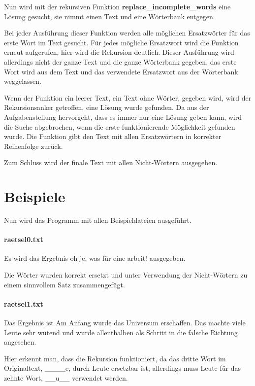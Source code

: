 \documentclass[a4paper,10pt,ngerman]{scrartcl}
\begin{document}
Nun wird mit der rekursiven Funktion \textbf{replace\_incomplete\_words} eine Lösung gesucht, sie nimmt einen Text und eine Wörterbank entgegen.

Bei jeder Ausführung dieser Funktion werden alle möglichen Ersatzwörter für das erste Wort im Text gesucht.
Für jedes mögliche Ersatzwort wird die Funktion erneut aufgerufen, hier wird die Rekursion deutlich.
Dieser Ausführung wird allerdings nicht der ganze Text und die ganze Wörterbank gegeben, das erste Wort wird aus dem Text und das verwendete Ersatzwort aus der Wörterbank weggelassen.

Wenn der Funktion ein leerer Text, ein Text ohne Wörter, gegeben wird, wird der Rekursionsanker getroffen, eine Lösung wurde gefunden.
Da aus der Aufgabenstellung hervorgeht, dass es immer nur eine Lösung geben kann, wird die Suche abgebrochen, wenn die erste funktionierende Möglichkeit gefunden wurde.
Die Funktion gibt den Text mit allen Ersatzwörtern in korrekter Reihenfolge zurück.

Zum Schluss wird der finale Text mit allen Nicht-Wörtern ausgegeben.

\section{Beispiele}

Nun wird das Programm mit allen Beispieldateien ausgeführt.

\paragraph{raetsel0.txt}
Es wird das Ergebnis \glqq oh je, was für eine arbeit!\grqq{} ausgegeben.

Die Wörter wurden korrekt ersetzt und unter Verwendung der Nicht-Wörtern zu einem sinnvollem Satz zusammengefügt.

\paragraph{raetsel1.txt}
Das Ergebnis ist \glqq Am Anfang wurde das Universum erschaffen.
Das machte viele Leute sehr wütend und wurde allenthalben als Schritt in die falsche Richtung angesehen.\grqq{}

Hier erkennt man, dass die Rekursion funktioniert, da das dritte Wort im Originaltext, \glqq \_\_\_\_e\grqq{}, durch \glqq Leute\grqq{} ersetzbar ist, allerdings muss \glqq Leute\grqq{} für das zehnte Wort, \glqq \_\_u\_\_\grqq{} verwendet werden.
\end{document}
